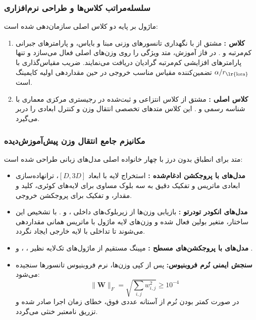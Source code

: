 \subsubsection*{سلسله‌مراتب کلاس‌ها و طراحی نرم‌افزاری}
ماژول بر پایه دو کلاس اصلی سازمان‌دهی شده است:
\begin{enumerate}
    \item \textbf{کلاس :} مشتق از  با نگهداری تانسورهای وزنی مبنا  و بایاس، و پارامترهای جبرانی کم‌مرتبه  و . در فاز آموزش، متد  ویژگی  را روی وزن‌های اصلی فعال می‌سازد و تنها پارامترهای افزایشی کم‌مرتبه گرادیان دریافت می‌نمایند. ضریب مقیاس‌گذاری با $\alpha / r_{\text{\lr{lora}}}$ تضمین‌کننده مقیاس مناسب خروجی در حین مقداردهی اولیه کایمینگ  است.
    \item \textbf{کلاس اصلی :} مشتق از کلاس انتزاعی  و ثبت‌شده در رجیستری مرکزی معماری با شناسه رسمی  و . این کلاس متدهای تخصصی انتقال وزن  و کنترل ابعادی را دربر می‌گیرد.
\end{enumerate}

\subsubsection*{مکانیزم جامع انتقال وزن پیش‌آموزش‌دیده }
متد  برای انطباق بدون درز با چهار خانواده اصلی مدل‌های زبانی طراحی شده است:
\begin{itemize}
    \item \textbf{مدل‌های با پروجکشن ادغام‌شده :} استخراج لایه  با ابعاد $[D, 3D]$، ترانهاده‌سازی ابعادی ماتریس و تفکیک دقیق به سه بلوک مساوی برای لایه‌های کوئری، کلید و مقدار، و تفکیک  برای پروجکشن خروجی.
    \item \textbf{مدل‌های انکودر تودرتو :} بازیابی وزن‌ها از زیربلوک‌های داخلی ،  و . با تشخیص این ساختار، متغیر بولین  فعال شده و وزن‌های لایه  ماژول با ماتریس همانی مقداردهی می‌شوند تا تداخلی با لایه خارجی  ایجاد نگردد.
    \item \textbf{مدل‌های با پروجکشن‌های مسطح :} مپینگ مستقیم از ماژول‌های تک‌لایه نظیر ، ،  و .
    \item \textbf{سنجش ایمنی نُرم فروبنیوس:} پس از کپی وزن‌ها، نرم فروبنیوس تانسورها سنجیده می‌شود:
    \begin{equation}
    \|\mathbf{W}\|_F = \sqrt{\sum_{i, j} w_{i, j}^2} \ge 10^{-4}
    \end{equation}
    در صورت کمتر بودن نُرم از آستانه عددی فوق، خطای زمان اجرا صادر شده و تزریق نامعتبر خنثی می‌گردد.
\end{itemize}

